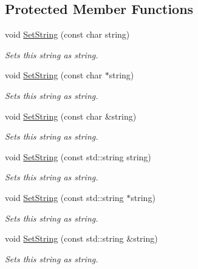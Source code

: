 \subsection*{Protected Member Functions}
\begin{DoxyCompactItemize}
\item 
void \hyperlink{class_triton_1_1_util_1_1_exe_string_a8c683476d22ac8dc336d07548826a758}{Set\+String} (const char string)
\begin{DoxyCompactList}\small\item\em Sets this string as string. \end{DoxyCompactList}\item 
void \hyperlink{class_triton_1_1_util_1_1_exe_string_ae687b9b2a0dddc0a59d6605c1486cab3}{Set\+String} (const char $\ast$string)
\begin{DoxyCompactList}\small\item\em Sets this string as string. \end{DoxyCompactList}\item 
void \hyperlink{class_triton_1_1_util_1_1_exe_string_a4faf549d8eb962d6f3568248c3573443}{Set\+String} (const char \&string)
\begin{DoxyCompactList}\small\item\em Sets this string as string. \end{DoxyCompactList}\item 
void \hyperlink{class_triton_1_1_util_1_1_exe_string_a4ebb0dc3b6a86459cbc44fe52f8011a4}{Set\+String} (const std\+::string string)
\begin{DoxyCompactList}\small\item\em Sets this string as string. \end{DoxyCompactList}\item 
void \hyperlink{class_triton_1_1_util_1_1_exe_string_a1fa06a0a2cda617635b6ad48d8c929e2}{Set\+String} (const std\+::string $\ast$string)
\begin{DoxyCompactList}\small\item\em Sets this string as string. \end{DoxyCompactList}\item 
void \hyperlink{class_triton_1_1_util_1_1_exe_string_a59847feb3b10d8086272c2bd2ced0a82}{Set\+String} (const std\+::string \&string)
\begin{DoxyCompactList}\small\item\em Sets this string as string. \end{DoxyCompactList}\item 

\end{DoxyCompactItemize}
